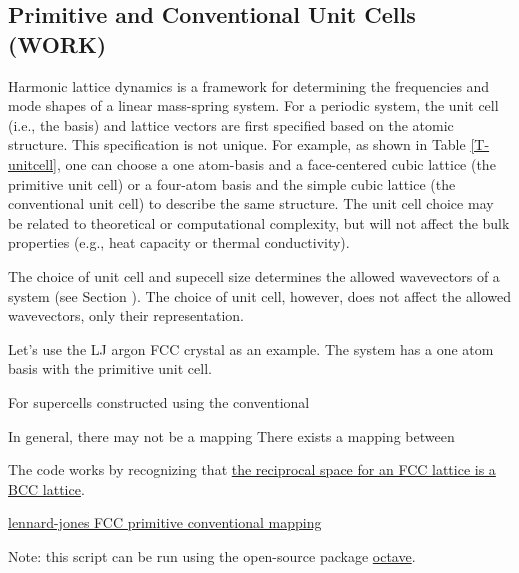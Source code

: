 \subsection{\label{A:unitcell}Primitive and Conventional 
Unit Cells (WORK)}

Harmonic lattice dynamics is a framework for determining the frequencies 
and mode shapes of a linear mass-spring system. For a periodic system, 
the unit cell (i.e., the basis) and lattice vectors are first specified 
based on the atomic structure. This specification is not unique. For 
example, as shown in Table \ref{T-unitcell}, one can choose a one 
atom-basis and a face-centered cubic lattice (the primitive unit cell) 
or a four-atom basis and the simple cubic lattice (the conventional unit 
cell) to describe the same structure. The unit cell choice may be related 
to theoretical or computational complexity, but will not affect the bulk 
properties (e.g., heat capacity or thermal conductivity).



The choice of unit cell and supecell size determines the allowed 
wavevectors of a system (see Section ). 
The choice of unit cell, however, does not affect the allowed 
wavevectors, only their representation. 

Let's use the LJ argon FCC crystal as an example.  The system has a one 
atom basis with the primitive unit cell. 

For supercells constructed 
using the conventional 

In general, there may not be a mapping There exists a mapping between 

The code works by recognizing that 
\href{http://en.wikipedia.org/wiki/Reciprocal_lattice#Face-centered_cubic_.28FCC.29_lattice}
{the reciprocal space for an FCC lattice is a BCC lattice}. 

\href{https://github.com/jasonlarkin/disorder/blob/master/matlab/m_lj_prim_conv_mapping.m}
{lennard-jones FCC primitive conventional mapping}

Note: this script can be run using the open-source package 
\href{http://www.gnu.org/software/octave/}{octave}.

